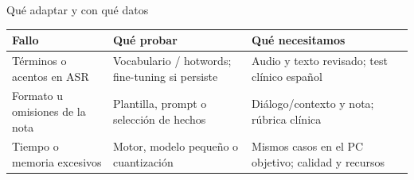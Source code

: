 \documentclass[aspectratio=169,10pt]{beamer}
\begin{document}

\begin{frame}{Qué adaptar y con qué datos}

  \vspace{3mm}
  {\small\renewcommand{\arraystretch}{1.6}
  \begin{tabularx}{\textwidth}{L{3.15cm}L{4.15cm}X}
    \toprule
    \textbf{Fallo} & \textbf{Qué probar} & \textbf{Qué necesitamos}\\
    \midrule
    Términos o acentos en ASR & Vocabulario / hotwords; fine-tuning si persiste & Audio y texto revisado; test clínico español\\
    Formato u omisiones de la nota & Plantilla, prompt o selección de hechos & Diálogo/contexto y nota; rúbrica clínica\\
    Tiempo o memoria excesivos & Motor, modelo pequeño o cuantización & Mismos casos en el PC objetivo; calidad y recursos\\
    \bottomrule
  \end{tabularx}}

\end{frame}
\end{document}
